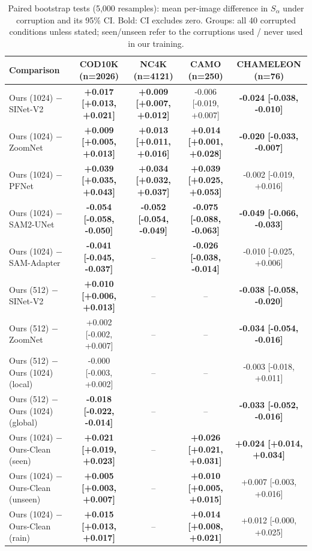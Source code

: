 \begin{table}[t]
\centering
\caption{Paired bootstrap tests (5{,}000 resamples): mean per-image difference in $S_\alpha$ under corruption and its 95\% CI. Bold: CI excludes zero. Groups: all 40 corrupted conditions unless stated; seen/unseen refer to the corruptions used / never used in our training.}
\label{tab:significance}
\footnotesize
\begin{tabular}{lcccc}
\toprule
Comparison & COD10K (n=2026) & NC4K (n=4121) & CAMO (n=250) & CHAMELEON (n=76) \\
\midrule
Ours (1024) $-$ SINet-V2 & \textbf{+0.017 [+0.013, +0.021]} & \textbf{+0.009 [+0.007, +0.012]} & -0.006 [-0.019, +0.007] & \textbf{-0.024 [-0.038, -0.010]} \\
Ours (1024) $-$ ZoomNet & \textbf{+0.009 [+0.005, +0.013]} & \textbf{+0.013 [+0.011, +0.016]} & \textbf{+0.014 [+0.001, +0.028]} & \textbf{-0.020 [-0.033, -0.007]} \\
Ours (1024) $-$ PFNet & \textbf{+0.039 [+0.035, +0.043]} & \textbf{+0.034 [+0.032, +0.037]} & \textbf{+0.039 [+0.025, +0.053]} & -0.002 [-0.019, +0.016] \\
Ours (1024) $-$ SAM2-UNet & \textbf{-0.054 [-0.058, -0.050]} & \textbf{-0.052 [-0.054, -0.049]} & \textbf{-0.075 [-0.088, -0.063]} & \textbf{-0.049 [-0.066, -0.033]} \\
Ours (1024) $-$ SAM-Adapter & \textbf{-0.041 [-0.045, -0.037]} & -- & \textbf{-0.026 [-0.038, -0.014]} & -0.010 [-0.025, +0.006] \\
Ours (512) $-$ SINet-V2 & \textbf{+0.010 [+0.006, +0.013]} & -- & -- & \textbf{-0.038 [-0.058, -0.020]} \\
Ours (512) $-$ ZoomNet & +0.002 [-0.002, +0.007] & -- & -- & \textbf{-0.034 [-0.054, -0.016]} \\
Ours (512) $-$ Ours (1024) (local) & -0.000 [-0.003, +0.002] & -- & -- & -0.003 [-0.018, +0.011] \\
Ours (512) $-$ Ours (1024) (global) & \textbf{-0.018 [-0.022, -0.014]} & -- & -- & \textbf{-0.033 [-0.052, -0.016]} \\
Ours (1024) $-$ Ours-Clean (seen) & \textbf{+0.021 [+0.019, +0.023]} & -- & \textbf{+0.026 [+0.021, +0.031]} & \textbf{+0.024 [+0.014, +0.034]} \\
Ours (1024) $-$ Ours-Clean (unseen) & \textbf{+0.005 [+0.003, +0.007]} & -- & \textbf{+0.010 [+0.005, +0.015]} & +0.007 [-0.003, +0.016] \\
Ours (1024) $-$ Ours-Clean (rain) & \textbf{+0.015 [+0.013, +0.017]} & -- & \textbf{+0.014 [+0.008, +0.021]} & +0.012 [-0.000, +0.025] \\
\bottomrule
\end{tabular}
\end{table}
